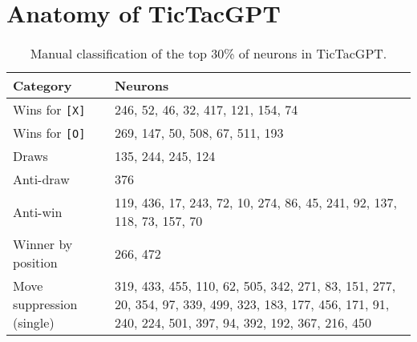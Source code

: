 \documentclass{article}
\newcommand{\ttgpt}{TicTacGPT\xspace}
\begin{document}
\newpage



\newpage

\appendix

\section{Anatomy of \ttgpt}
\label{sec:anatomy}

\begin{table}[h]
    \centering
    \caption{Manual classification of the top 30\% of neurons in \ttgpt.}
    \begin{tabular}{p{}p{}}
        \toprule
        Category
         & Neurons                                                                                                                                                  \\
        \midrule
        Wins for \texttt{[X]}
         & 246, 52, 46, 32, 417, 121, 154, 74                                                                                                                       \\
        Wins for \texttt{[O]}
         & 269, 147, 50, 508, 67, 511, 193                                                                                                                          \\
        Draws
         & 135, 244, 245, 124                                                                                                                                       \\
        Anti-draw
         & 376                                                                                                                                                      \\
        Anti-win
         & 119, 436, 17, 243, 72, 10, 274, 86, 45, 241, 92, 137, 118, 73, 157, 70                                                                                   \\
        Winner by position
         & 266, 472                                                                                                                                                 \\
        Move suppression (single)
         & 319, 433, 455, 110, 62, 505, 342, 271, 83, 151, 277, 20, 354, 97, 339, 499, 323, 183, 177, 456, 171, 91, 240, 224, 501, 397, 94, 392, 192, 367, 216, 450 \\

\end{tabular}
\end{table}
\end{document}
